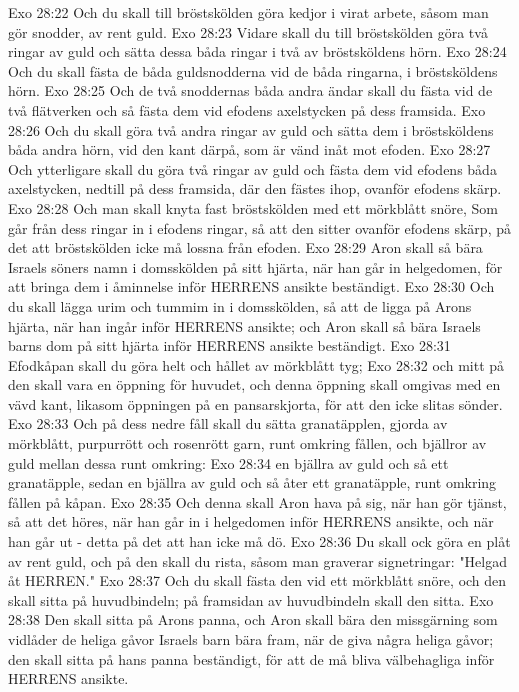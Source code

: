 Exo 28:22  Och du skall till bröstskölden göra kedjor i virat arbete, såsom man gör snodder, av rent guld.
Exo 28:23  Vidare skall du till bröstskölden göra två ringar av guld och sätta dessa båda ringar i två av bröstsköldens hörn.
Exo 28:24  Och du skall fästa de båda guldsnodderna vid de båda ringarna, i bröstsköldens hörn.
Exo 28:25  Och de två snoddernas båda andra ändar skall du fästa vid de två flätverken och så fästa dem vid efodens axelstycken på dess framsida.
Exo 28:26  Och du skall göra två andra ringar av guld och sätta dem i bröstsköldens båda andra hörn, vid den kant därpå, som är vänd inåt mot efoden.
Exo 28:27  Och ytterligare skall du göra två ringar av guld och fästa dem vid efodens båda axelstycken, nedtill på dess framsida, där den fästes ihop, ovanför efodens skärp.
Exo 28:28  Och man skall knyta fast bröstskölden med ett mörkblått snöre, Som går från dess ringar in i efodens ringar, så att den sitter ovanför efodens skärp, på det att bröstskölden icke må lossna från efoden.
Exo 28:29  Aron skall så bära Israels söners namn i domsskölden på sitt hjärta, när han går in helgedomen, för att bringa dem i åminnelse inför HERRENS ansikte beständigt.
Exo 28:30  Och du skall lägga urim och tummim in i domsskölden, så att de ligga på Arons hjärta, när han ingår inför HERRENS ansikte; och Aron skall så bära Israels barns dom på sitt hjärta inför HERRENS ansikte beständigt.
Exo 28:31  Efodkåpan skall du göra helt och hållet av mörkblått tyg;
Exo 28:32  och mitt på den skall vara en öppning för huvudet, och denna öppning skall omgivas med en vävd kant, likasom öppningen på en pansarskjorta, för att den icke slitas sönder.
Exo 28:33  Och på dess nedre fåll skall du sätta granatäpplen, gjorda av mörkblått, purpurrött och rosenrött garn, runt omkring fållen, och bjällror av guld mellan dessa runt omkring:
Exo 28:34  en bjällra av guld och så ett granatäpple, sedan en bjällra av guld och så åter ett granatäpple, runt omkring fållen på kåpan.
Exo 28:35  Och denna skall Aron hava på sig, när han gör tjänst, så att det höres, när han går in i helgedomen inför HERRENS ansikte, och när han går ut - detta på det att han icke må dö.
Exo 28:36  Du skall ock göra en plåt av rent guld, och på den skall du rista, såsom man graverar signetringar: "Helgad åt HERREN."
Exo 28:37  Och du skall fästa den vid ett mörkblått snöre, och den skall sitta på huvudbindeln; på framsidan av huvudbindeln skall den sitta.
Exo 28:38  Den skall sitta på Arons panna, och Aron skall bära den missgärning som vidlåder de heliga gåvor Israels barn bära fram, när de giva några heliga gåvor; den skall sitta på hans panna beständigt, för att de må bliva välbehagliga inför HERRENS ansikte.
